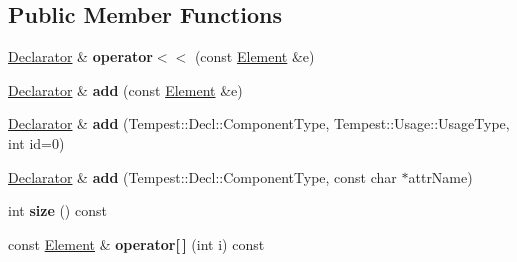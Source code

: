 \subsection*{Public Member Functions}
\begin{DoxyCompactItemize}
\item 
\hypertarget{class_tempest_1_1_vertex_declaration_1_1_declarator_ab288a1dca3e949477f71b78511ef6231}{\hyperlink{class_tempest_1_1_vertex_declaration_1_1_declarator}{Declarator} \& {\bfseries operator$<$$<$} (const \hyperlink{struct_tempest_1_1_vertex_declaration_1_1_declarator_1_1_element}{Element} \&e)}\label{class_tempest_1_1_vertex_declaration_1_1_declarator_ab288a1dca3e949477f71b78511ef6231}

\item 
\hypertarget{class_tempest_1_1_vertex_declaration_1_1_declarator_a2722579b7e6913e71d3b45b4c51c48a6}{\hyperlink{class_tempest_1_1_vertex_declaration_1_1_declarator}{Declarator} \& {\bfseries add} (const \hyperlink{struct_tempest_1_1_vertex_declaration_1_1_declarator_1_1_element}{Element} \&e)}\label{class_tempest_1_1_vertex_declaration_1_1_declarator_a2722579b7e6913e71d3b45b4c51c48a6}

\item 
\hypertarget{class_tempest_1_1_vertex_declaration_1_1_declarator_aa8c5ac431cb0d38333c3f9085d8d9f27}{\hyperlink{class_tempest_1_1_vertex_declaration_1_1_declarator}{Declarator} \& {\bfseries add} (Tempest\+::\+Decl\+::\+Component\+Type, Tempest\+::\+Usage\+::\+Usage\+Type, int id=0)}\label{class_tempest_1_1_vertex_declaration_1_1_declarator_aa8c5ac431cb0d38333c3f9085d8d9f27}

\item 
\hypertarget{class_tempest_1_1_vertex_declaration_1_1_declarator_a80d8b1c0ed1079df9065b9a302b5223d}{\hyperlink{class_tempest_1_1_vertex_declaration_1_1_declarator}{Declarator} \& {\bfseries add} (Tempest\+::\+Decl\+::\+Component\+Type, const char $\ast$attr\+Name)}\label{class_tempest_1_1_vertex_declaration_1_1_declarator_a80d8b1c0ed1079df9065b9a302b5223d}

\item 
\hypertarget{class_tempest_1_1_vertex_declaration_1_1_declarator_a88eb4ad917b17dcf89b20bf18180c5d2}{int {\bfseries size} () const }\label{class_tempest_1_1_vertex_declaration_1_1_declarator_a88eb4ad917b17dcf89b20bf18180c5d2}

\item 
\hypertarget{class_tempest_1_1_vertex_declaration_1_1_declarator_a41471113d883f55e43e873be1a5e51fb}{const \hyperlink{struct_tempest_1_1_vertex_declaration_1_1_declarator_1_1_element}{Element} \& {\bfseries operator\mbox{[}$\,$\mbox{]}} (int i) const }\label{class_tempest_1_1_vertex_declaration_1_1_declarator_a41471113d883f55e43e873be1a5e51fb}


\end{DoxyCompactItemize}
